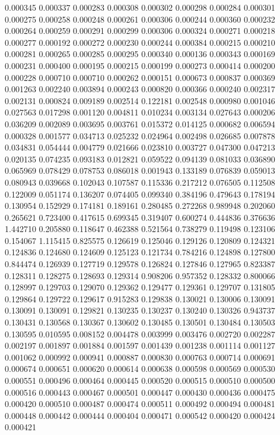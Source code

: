 0.000345
0.000337
0.000283
0.000308
0.000302
0.000298
0.000284
0.000301
0.000275
0.000258
0.000248
0.000261
0.000306
0.000244
0.000360
0.000232
0.000264
0.000259
0.000291
0.000299
0.000306
0.000324
0.000271
0.000218
0.000277
0.000192
0.000272
0.000230
0.000244
0.000384
0.000215
0.000210
0.000281
0.000265
0.000285
0.000295
0.000340
0.000136
0.000343
0.000169
0.000231
0.000400
0.000195
0.000215
0.000199
0.000273
0.000414
0.000200
0.000228
0.000710
0.000710
0.000262
0.000151
0.000673
0.000837
0.000369
0.001263
0.002240
0.003894
0.000243
0.000820
0.000366
0.000240
0.002317
0.002131
0.000824
0.009189
0.002514
0.122181
0.002548
0.000980
0.001046
0.027563
0.017298
0.001120
0.004811
0.010234
0.003134
0.027643
0.000206
0.036209
0.002089
0.003695
0.003761
0.015372
0.014125
0.000682
0.006594
0.000328
0.001577
0.034713
0.025232
0.024964
0.002498
0.026685
0.007878
0.034831
0.054444
0.004779
0.021666
0.023810
0.003727
0.047300
0.047213
0.020135
0.074235
0.093183
0.012821
0.059522
0.094139
0.081033
0.036890
0.065969
0.078429
0.078753
0.086018
0.001943
0.133189
0.076839
0.059013
0.080943
0.039668
0.102043
0.107587
0.115336
0.217212
0.076505
0.112508
0.122009
0.051174
0.136207
0.074405
0.099340
0.384196
0.479643
0.178194
0.130954
0.152929
0.174181
0.189161
0.280485
0.272268
0.989948
0.202060
0.265621
0.723400
0.417615
0.699345
0.319407
0.600274
0.444836
0.376636
1.442710
0.205880
0.118647
0.462388
0.521564
0.738279
0.119498
0.123106
0.154067
1.115415
0.825575
0.126619
0.125046
0.129126
0.120809
0.124321
0.124836
0.124680
0.124609
0.125123
0.121734
0.784216
0.124898
0.127800
0.844474
0.126939
0.127719
0.129578
0.126824
0.127846
0.127965
0.823387
0.128311
0.128275
0.128693
0.129314
0.908206
0.957352
0.128332
0.800066
0.128997
0.129703
0.129070
0.129362
0.129477
0.129361
0.129707
0.131805
0.129864
0.129722
0.129617
0.915283
0.129838
0.130021
0.130006
0.130091
0.130091
0.130091
0.129821
0.130235
0.130237
0.130240
0.130326
0.943737
0.130431
0.130568
0.130367
0.130602
0.130485
0.130501
0.130484
0.130503
0.130595
0.010595
0.008152
0.004478
0.003999
0.003476
0.002720
0.002287
0.002197
0.001897
0.001884
0.001597
0.001439
0.001238
0.001114
0.001127
0.001062
0.000992
0.000941
0.000887
0.000830
0.000763
0.000714
0.000691
0.000674
0.000651
0.000620
0.000614
0.000638
0.000598
0.000569
0.000530
0.000551
0.000496
0.000464
0.000445
0.000520
0.000515
0.000510
0.000500
0.000516
0.000443
0.000467
0.000501
0.000447
0.000430
0.000436
0.000475
0.000420
0.000510
0.000487
0.000474
0.000511
0.000492
0.000494
0.000481
0.000448
0.000442
0.000444
0.000404
0.000471
0.000542
0.000420
0.000424
0.000421
